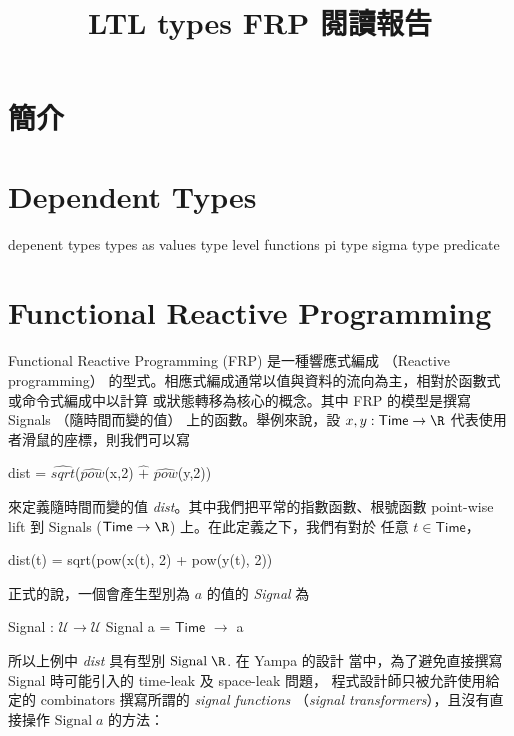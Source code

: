 \documentclass{article}
\newcommand{\U}{\mathcal{U}}
\begin{document}
\title{LTL types FRP 閱讀報告}
\author{}
\date{}
\maketitle

\newcommand{\Time}{\mathsf{Time}}

\section{簡介}
\section{Dependent Types}
  depenent types
  types as values
  type level functions
  pi type
  sigma type
  predicate

\section{Functional Reactive Programming}
  Functional Reactive Programming (FRP) 是一種響應式編成
  （Reactive programming）
  的型式。相應式編成通常以值與資料的流向為主，相對於函數式或命令式編成中以計算
  或狀態轉移為核心的概念。其中 FRP 的模型是撰寫 Signals （隨時間而變的值）
  上的函數。舉例來說，設 $x,y:\Time\to\R$ 代表使用者滑鼠的座標，則我們可以寫

  \begin{code}
  dist = $\widehat{\mathit{sqrt}}$($\widehat{\mathit{pow}}$(x,2) $\widehat{+}$ $\widehat{\mathit{pow}}$(y,2))
  \end{code}

  來定義隨時間而變的值 \textit{dist}。其中我們把平常的指數函數、根號函數
  point-wise lift 到 Signals ($\Time\to\R$) 上。在此定義之下，我們有對於
  任意 $t\in\Time$，

  \begin{code}
  dist(t) = sqrt(pow(x(t), 2) + pow(y(t), 2))
  \end{code}

  正式的說，一個會產生型別為 $a$ 的值的 \emph{Signal} 為

  \begin{code}
  Signal : $\U\to\U$
  Signal a = $\Time$ $\to$ a
  \end{code}

  所以上例中 \textit{dist} 具有型別 $\text{Signal}\; \R$. 在 Yampa 的設計
  當中，為了避免直接撰寫 Signal 時可能引入的 time-leak 及 space-leak 問題，
  程式設計師只被允許使用給定的 combinators 撰寫所謂的 \emph{signal functions}
  （\emph{signal transformers}），且沒有直接操作 $\text{Signal}\; a$ 的方法：
\end{document}

